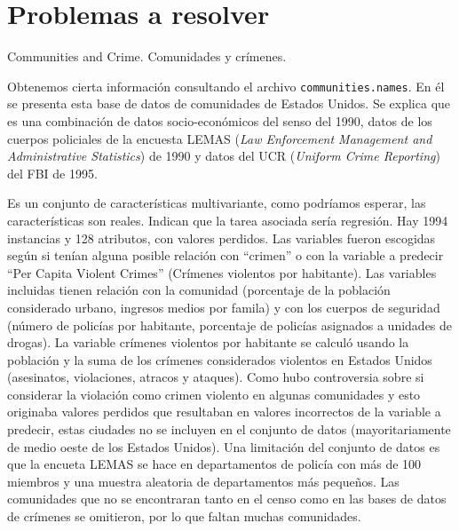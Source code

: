 \documentclass[a4paper, 20pt]{article}
\begin{document}
{\parskip=2pt
  \tableofcontents
}
\pagebreak


\section{Problemas a resolver}

Communities and Crime. Comunidades y crímenes. \cite{com_uci}

Obtenemos cierta información consultando el archivo \texttt{communities.names}. En él se presenta esta base de datos de comunidades de Estados Unidos. Se explica que es una combinación de datos socio-económicos del senso del 1990, datos de los cuerpos policiales de la encuesta LEMAS (\textit{Law Enforcement Management and Administrative Statistics}) de 1990 y datos del UCR (\textit{Uniform Crime Reporting}) del FBI de 1995.

Es un conjunto de características multivariante, como podríamos esperar, las características son reales. Indican que la tarea asociada sería regresión. Hay 1994 instancias y 128 atributos, con valores perdidos. Las variables fueron escogidas según si tenían alguna posible relación con ``crimen'' o con la variable a predecir ``Per Capita Violent Crimes'' (Crímenes violentos por habitante). Las variables incluidas tienen relación con la comunidad (porcentaje de la población considerado urbano, ingresos medios por famila) y con los cuerpos de seguridad (número de policías por habitante, porcentaje de policías asignados a unidades de drogas). La variable crímenes violentos por habitante se calculó usando la población y la suma de los crímenes considerados violentos en Estados Unidos (asesinatos, violaciones, atracos y ataques). Como hubo controversia sobre si considerar la violación como crimen violento en algunas comunidades y esto originaba valores perdidos que resultaban en valores incorrectos de la variable a predecir, estas ciudades no se incluyen en el conjunto de datos (mayoritariamente de medio oeste de los Estados Unidos). Una limitación del conjunto de datos es que la encueta LEMAS se hace en departamentos de policía con más de 100 miembros y una muestra aleatoria de departamentos más pequeños. Las comunidades que no se encontraran tanto en el censo como en las bases de datos de crímenes se omitieron, por lo que faltan muchas comunidades.
\end{document}
